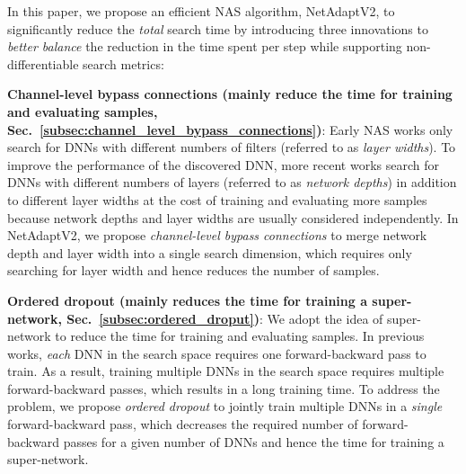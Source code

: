 In this paper, we propose an efficient NAS algorithm, NetAdaptV2, to significantly reduce the \emph{total} search time by introducing three innovations to \emph{better balance} the reduction in the time spent per step while supporting non-differentiable search metrics:

\textbf{Channel-level bypass connections (mainly reduce the time for training and evaluating samples, Sec.~\ref{subsec:channel_level_bypass_connections})}: Early NAS works only search for DNNs with different numbers of filters (referred to as \emph{layer widths}). To improve the performance of the discovered DNN, more recent works search for DNNs with different numbers of layers (referred to as \emph{network depths}) in addition to different layer widths at the cost of training and evaluating more samples because network depths and layer widths are usually considered independently. In NetAdaptV2, we propose \emph{channel-level bypass connections} to merge network depth and layer width into a single search dimension, which requires only searching for layer width and hence reduces the number of samples.

\textbf{Ordered dropout (mainly reduces the time for training a super-network, Sec.~\ref{subsec:ordered_droput})}: We adopt the idea of super-network to reduce the time for training and evaluating samples. In previous works, \emph{each} DNN in the search space requires one forward-backward pass to train. As a result, training multiple DNNs in the search space requires multiple forward-backward passes, which results in a long training time. To address the problem, we propose \emph{ordered dropout} to jointly train multiple DNNs in a \emph{single} forward-backward pass, which decreases the required number of forward-backward passes for a given number of DNNs and hence the time for training a super-network.

